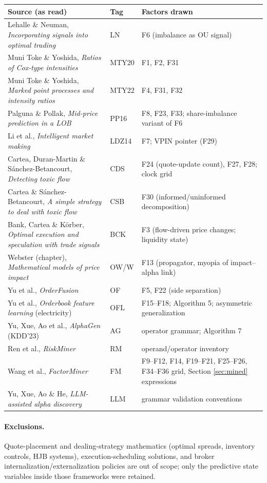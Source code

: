 \documentclass[11pt]{article}
\begin{document}
\begin{center}
\small
\begin{tabular}{@{}p{5.6cm}lp{6.2cm}@{}}
\toprule
Source (as read) & Tag & Factors drawn \\
\midrule
Lehalle \& Neuman, \emph{Incorporating signals into optimal trading} & LN & F6 (imbalance as OU signal) \\
Muni Toke \& Yoshida, \emph{Ratios of Cox-type intensities} & MTY20 & F1, F2, F31 \\
Muni Toke \& Yoshida, \emph{Marked point processes and intensity ratios} & MTY22 & F4, F31, F32 \\
Palguna \& Pollak, \emph{Mid-price prediction in a LOB} & PP16 & F8, F23, F33; share-imbalance variant of F6 \\
Li et al., \emph{Intelligent market making} & LDZ14 & F7; VPIN pointer (F29) \\
Cartea, Duran-Martin \& S\'anchez-Betancourt, \emph{Detecting toxic flow} & CDS & F24 (quote-update count), F27, F28; clock grid \\
Cartea \& S\'anchez-Betancourt, \emph{A simple strategy to deal with toxic flow} & CSB & F30 (informed/uninformed decomposition) \\
Bank, Cartea \& K\"orber, \emph{Optimal execution and speculation with trade signals} & BCK & F3 (flow-driven price changes; liquidity state) \\
Webster (chapter), \emph{Mathematical models of price impact} & OW/W & F13 (propagator, myopia of impact--alpha link) \\
Yu et al., \emph{OrderFusion} & OF & F5, F22 (side separation) \\
Yu et al., \emph{Orderbook feature learning} (electricity) & OFL & F15--F18; Algorithm 5; asymmetric generalization \\
Yu, Xue, Ao et al., \emph{AlphaGen} (KDD'23) & AG & operator grammar; Algorithm 7 \\
Ren et al., \emph{RiskMiner} & RM & operand/operator inventory \\
Wang et al., \emph{FactorMiner} & FM & F9--F12, F14, F19--F21, F25--F26, F34--F36 grid, Section \ref{sec:mined} expressions \\
Yu, Xue, Ao \& He, \emph{LLM-assisted alpha discovery} & LLM & grammar validation conventions \\
\bottomrule
\end{tabular}
\end{center}

\paragraph{Exclusions.} Quote-placement and dealing-strategy mathematics (optimal spreads, inventory controls, HJB systems), execution-scheduling solutions, and broker internalization/externalization policies are out of scope; only the predictive state variables inside those frameworks were retained.
\end{document}
